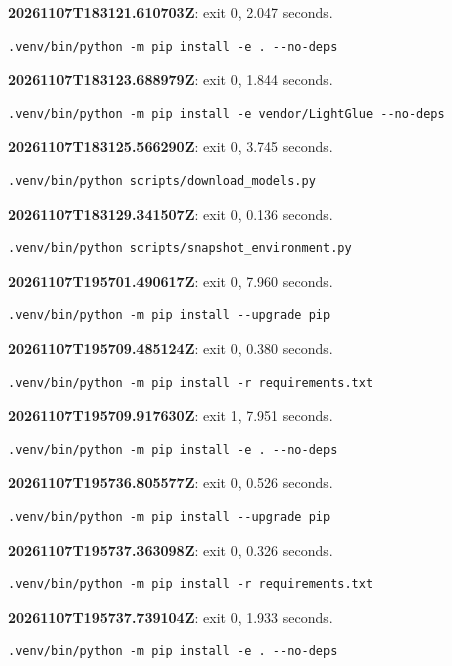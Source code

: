 \noindent\textbf{20261107T183121.610703Z}: exit 0, 2.047 seconds.
\begin{lstlisting}[numbers=none]
.venv/bin/python -m pip install -e . --no-deps
\end{lstlisting}

\noindent\textbf{20261107T183123.688979Z}: exit 0, 1.844 seconds.
\begin{lstlisting}[numbers=none]
.venv/bin/python -m pip install -e vendor/LightGlue --no-deps
\end{lstlisting}

\noindent\textbf{20261107T183125.566290Z}: exit 0, 3.745 seconds.
\begin{lstlisting}[numbers=none]
.venv/bin/python scripts/download_models.py
\end{lstlisting}

\noindent\textbf{20261107T183129.341507Z}: exit 0, 0.136 seconds.
\begin{lstlisting}[numbers=none]
.venv/bin/python scripts/snapshot_environment.py
\end{lstlisting}

\noindent\textbf{20261107T195701.490617Z}: exit 0, 7.960 seconds.
\begin{lstlisting}[numbers=none]
.venv/bin/python -m pip install --upgrade pip
\end{lstlisting}

\noindent\textbf{20261107T195709.485124Z}: exit 0, 0.380 seconds.
\begin{lstlisting}[numbers=none]
.venv/bin/python -m pip install -r requirements.txt
\end{lstlisting}

\noindent\textbf{20261107T195709.917630Z}: exit 1, 7.951 seconds.
\begin{lstlisting}[numbers=none]
.venv/bin/python -m pip install -e . --no-deps
\end{lstlisting}

\noindent\textbf{20261107T195736.805577Z}: exit 0, 0.526 seconds.
\begin{lstlisting}[numbers=none]
.venv/bin/python -m pip install --upgrade pip
\end{lstlisting}

\noindent\textbf{20261107T195737.363098Z}: exit 0, 0.326 seconds.
\begin{lstlisting}[numbers=none]
.venv/bin/python -m pip install -r requirements.txt
\end{lstlisting}

\noindent\textbf{20261107T195737.739104Z}: exit 0, 1.933 seconds.
\begin{lstlisting}[numbers=none]
.venv/bin/python -m pip install -e . --no-deps
\end{lstlisting}

